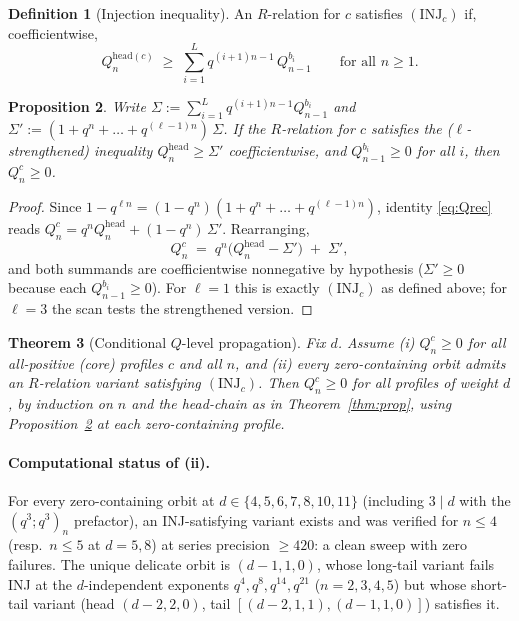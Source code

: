 \documentclass[11pt]{article}
\newtheorem{theorem}{Theorem}
\newtheorem{proposition}[theorem]{Proposition}
\theoremstyle{definition}
\newtheorem{definition}[theorem]{Definition}
\begin{document}
\begin{definition}[Injection inequality]
An $R$-relation for $c$ satisfies $(\mathrm{INJ}_c)$ if, coefficientwise,
\[
Q_n^{\mathrm{head}(c)} \;\ge\; \sum_{i=1}^{L} q^{(i+1)n-1}\, Q_{n-1}^{b_i}
\qquad\text{for all } n\ge 1.
\]
\end{definition}

\begin{proposition}\label{prop:inj}
Write $\Sigma := \sum_{i=1}^{L} q^{(i+1)n-1} Q_{n-1}^{b_i}$ and
$\Sigma' := (1+q^n+\dots+q^{(\ell-1)n})\,\Sigma$. If the $R$-relation for $c$
satisfies the ($\ell$-strengthened) inequality $Q_n^{\mathrm{head}}\ge \Sigma'$
coefficientwise, and $Q_{n-1}^{b_i}\ge 0$ for all $i$, then $Q_n^c\ge 0$.
\end{proposition}

\begin{proof}
Since $1-q^{\ell n}=(1-q^n)(1+q^n+\dots+q^{(\ell-1)n})$, identity \eqref{eq:Qrec}
reads $Q_n^c = q^n Q_n^{\mathrm{head}} + (1-q^n)\,\Sigma'$. Rearranging,
\[
Q_n^c \;=\; q^n\big(Q_n^{\mathrm{head}} - \Sigma'\big) \;+\; \Sigma',
\]
and both summands are coefficientwise nonnegative by hypothesis
($\Sigma'\ge 0$ because each $Q_{n-1}^{b_i}\ge 0$).
For $\ell=1$ this is exactly $(\mathrm{INJ}_c)$ as defined above; for $\ell=3$
the scan tests the strengthened version.
\end{proof}

\begin{theorem}[Conditional $Q$-level propagation]\label{thm:condQ}
Fix $d$. Assume (i) $Q_n^c\ge 0$ for all all-positive (core) profiles $c$ and all $n$,
and (ii) every zero-containing orbit admits an $R$-relation variant satisfying
$(\mathrm{INJ}_c)$. Then $Q_n^c\ge 0$ for all profiles of weight $d$, by induction on
$n$ and the head-chain as in Theorem~\ref{thm:prop}, using
Proposition~\ref{prop:inj} at each zero-containing profile.
\end{theorem}

\paragraph{Computational status of (ii).} For every zero-containing orbit at
$d\in\{4,5,6,7,8,10,11\}$ (including $3\mid d$ with the $(q^3;q^3)_n$ prefactor), an
INJ-satisfying variant exists and was verified for $n\le 4$ (resp.\ $n\le5$ at
$d=5,8$) at series precision $\ge 420$: a clean sweep with zero failures. The unique
delicate orbit is $(d{-}1,1,0)$, whose long-tail variant fails INJ at the
$d$-independent exponents $q^4,q^8,q^{14},q^{21}$ ($n=2,3,4,5$) but whose short-tail
variant (head $(d{-}2,2,0)$, tail $[(d{-}2,1,1),(d{-}1,1,0)]$) satisfies it.
\end{document}
